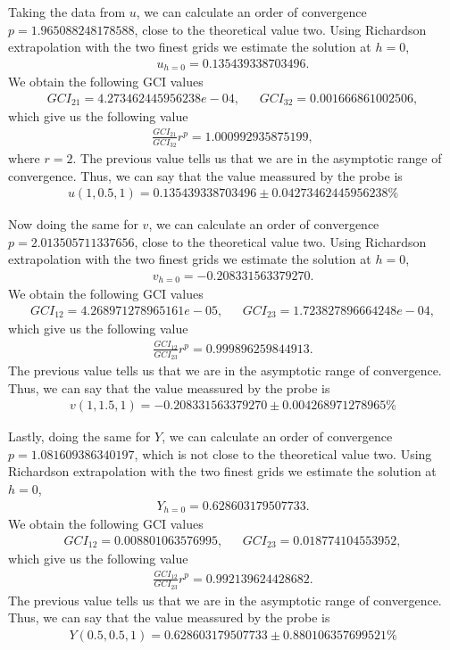 Taking the data from $u$, we can calculate an order of convergence $p=1.965088248178588$, close to the theoretical value two. Using Richardson extrapolation with the two finest grids we estimate the solution at $h=0$,
\begin{align*}
u_{h=0}=0.135439338703496.
\end{align*}
We obtain the following GCI values
\begin{align*}
GCI_{21}=4.273462445956238e-04,~~~~~~~GCI_{32}=0.001666861002506,
\end{align*}
which give us the following value
\begin{align*}
\frac{GCI_{21}}{GCI_{32}}r^p=1.000992935875199,
\end{align*}
where $r=2$. The previous value tells us that we are in the asymptotic range of convergence. Thus, we can say that the value meassured by the probe is
\begin{align*}
u(1,0.5,1)=0.135439338703496\pm 0.04273462445956238\%
\end{align*}

Now doing the same for $v$, we can calculate an order of convergence $p=2.013505711337656$, close to the theoretical value two. Using Richardson extrapolation with the two finest grids we estimate the solution at $h=0$,
\begin{align*}
v_{h=0}=  -0.208331563379270.
\end{align*}
We obtain the following GCI values
\begin{align*}
GCI_{12}=4.268971278965161e-05,~~~~~~~GCI_{23}=1.723827896664248e-04,
\end{align*}
which give us the following value
\begin{align*}
\frac{GCI_{12}}{GCI_{23}}r^p=   0.999896259844913.
\end{align*}
The previous value tells us that we are in the asymptotic range of convergence. Thus, we can say that the value meassured by the probe is
\begin{align*}
v(1,1.5,1)=-0.208331563379270\pm 0.004268971278965\%
\end{align*}

Lastly, doing the same for $Y$, we can calculate an order of convergence $p=1.081609386340197$, which is not close to the theoretical value two. Using Richardson extrapolation with the two finest grids we estimate the solution at $h=0$,
\begin{align*}
Y_{h=0}=    0.628603179507733.
\end{align*}
We obtain the following GCI values
\begin{align*}
GCI_{12}=   0.008801063576995,~~~~~~~GCI_{23}=   0.018774104553952,
\end{align*}
which give us the following value
\begin{align*}
\frac{GCI_{12}}{GCI_{23}}r^p=      0.992139624428682.
\end{align*}
The previous value tells us that we are in the asymptotic range of convergence. Thus, we can say that the value meassured by the probe is
\begin{align*}
Y(0.5,0.5,1)=0.628603179507733\pm    0.880106357699521\%
\end{align*}